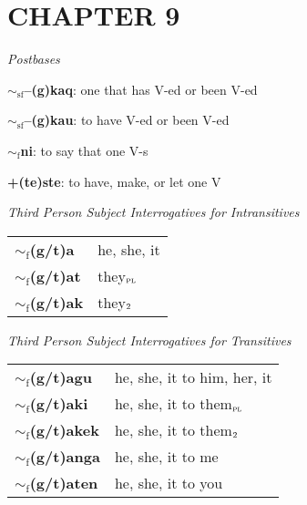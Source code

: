 \documentclass{article}
\begin{document}
\section*{CHAPTER 9}

\textit{Postbases}
\begin{description}
\item \textbf{$\sim_\text{sf}$--(g)kaq}: one that has V-ed or been V-ed
\item \textbf{$\sim_\text{sf}$--(g)kau}: to have V-ed or been V-ed
\item \textbf{$\sim_\text{f}$ni}: to say that one V-s
\item \textbf{+(te)ste}: to have, make, or let one V
\end{description}

\bigskip

\textit{Third Person Subject Interrogatives for Intransitives}

\begin{tabular}{ l l }
\textbf{$\sim_\text{f}$(g/t)a} & he, she, it\\
\textbf{$\sim_\text{f}$(g/t)at} & they$_\text{\textsc{pl}}$ \\
\textbf{$\sim_\text{f}$(g/t)ak} & they$_\text{\textsc{2}}$ \\
\end{tabular}

\bigskip

\textit{Third Person Subject Interrogatives for Transitives}

\begin{tabular}{ l l }
\textbf{$\sim_\text{f}$(g/t)agu} & he, she, it to him, her, it\\
\textbf{$\sim_\text{f}$(g/t)aki} & he, she, it to them$_\text{\textsc{pl}}$ \\
\textbf{$\sim_\text{f}$(g/t)akek} & he, she, it to them$_\text{\textsc{2}}$ \\
\textbf{$\sim_\text{f}$(g/t)anga} & he, she, it to me \\
\textbf{$\sim_\text{f}$(g/t)aten} & he, she, it to you
\end{tabular}

\end{document}
